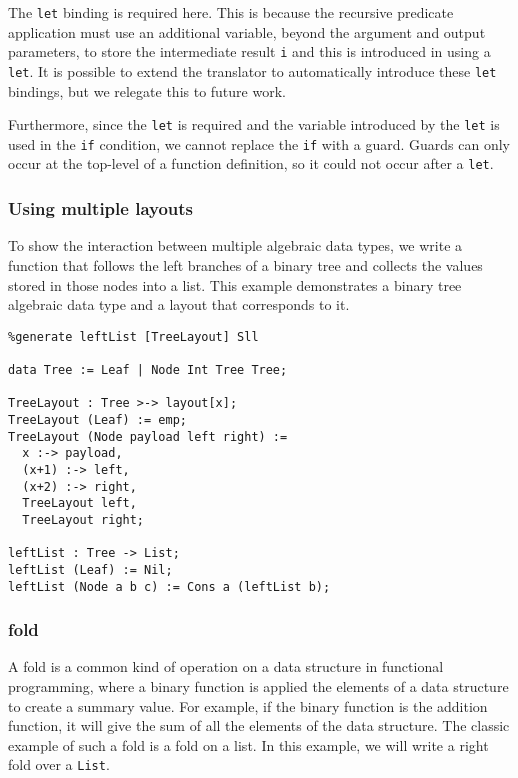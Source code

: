 \noindent
The \verb|let| binding is required here. This is because the recursive predicate
application must use an additional variable, beyond the argument and output
parameters, to store the intermediate result \verb|i| and this is introduced in
\Pika{} using a \verb|let|. It is possible to extend the translator to
automatically introduce these \verb|let| bindings, but we relegate this to future work.

Furthermore, since the \verb|let| is required and the variable introduced by the \verb|let| is used
in the \verb|if| condition, we cannot replace the \verb|if| with a guard. Guards can only occur
at the top-level of a function definition, so it could not occur after a \verb|let|.

\subsubsection{Using multiple layouts}

To show the interaction between multiple algebraic data types, we write a
function that follows the left branches of a binary tree and collects the values
stored in those nodes into a list. This example demonstrates a binary tree
algebraic data type and a layout that corresponds to it.

\begin{lstlisting}
%generate leftList [TreeLayout] Sll

data Tree := Leaf | Node Int Tree Tree;

TreeLayout : Tree >-> layout[x];
TreeLayout (Leaf) := emp;
TreeLayout (Node payload left right) :=
  x :-> payload,
  (x+1) :-> left,
  (x+2) :-> right,
  TreeLayout left,
  TreeLayout right;

leftList : Tree -> List;
leftList (Leaf) := Nil;
leftList (Node a b c) := Cons a (leftList b);
\end{lstlisting}


\subsubsection{fold}
\label{sec:examples-fold}

A fold is a common kind of operation on a data structure in functional programming, where a binary function
is applied the elements of a data structure to create a summary value. For example, if the binary function
is the addition function, it will give the sum of all the elements of the data structure. The
classic example of such a fold is a fold on a list. In this example, we will write a
right fold over a \verb|List|.

